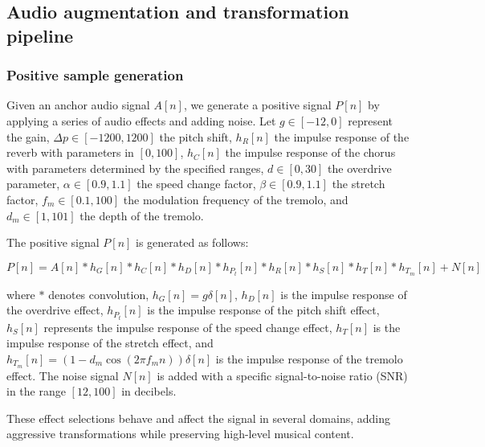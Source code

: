 \subsection{Audio augmentation and transformation pipeline}

%

\subsubsection{Positive sample generation}
Given an anchor audio signal $A[n]$, we generate a positive signal $P[n]$ by applying a series of audio effects and adding noise. Let $g \in [-12, 0]$ represent the gain, $\Delta p \in [-1200, 1200]$ the pitch shift, $h_R[n]$ the impulse response of the reverb with parameters in $[0, 100]$, $h_C[n]$ the impulse response of the chorus with parameters determined by the specified ranges, $d \in [0, 30]$ the overdrive parameter, $\alpha \in [0.9, 1.1]$ the speed change factor, $\beta \in [0.9, 1.1]$ the stretch factor, $f_m \in [0.1, 100]$ the modulation frequency of the tremolo, and $d_m \in [1, 101]$ the depth of the tremolo. 

The positive signal $P[n]$ is generated as follows:

\begin{equation}\label{eq:positive_signal}
P[n] = A[n] \ast h_{G}[n] \ast h_{C}[n] \ast h_{D}[n] \ast h_{P_t}[n] \ast h_{R}[n] \ast h_{S}[n] \ast h_{T}[n] \ast h_{T_m}[n] + N[n]
\end{equation}

where $\ast$ denotes convolution, $h_{G}[n] = g \delta[n]$, $h_{D}[n]$ is the impulse response of the overdrive effect, $h_{P_t}[n]$ is the impulse response of the pitch shift effect, $h_{S}[n]$ represents the impulse response of the speed change effect, $h_{T}[n]$ is the impulse response of the stretch effect, and $h_{T_m}[n] = (1 - d_m \cos(2 \pi f_m n))\delta[n]$ is the impulse response of the tremolo effect. The noise signal $N[n]$ is added with a specific signal-to-noise ratio (SNR) in the range $[12, 100]$ in decibels.

These effect selections behave and affect the signal in several domains, adding aggressive transformations while preserving high-level musical content.

